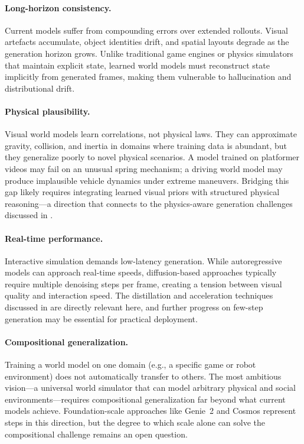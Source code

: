 \documentclass{llmxive}
\begin{document}
\paragraph{Long-horizon consistency.} Current models suffer from compounding errors over extended rollouts. Visual artefacts accumulate, object identities drift, and spatial layouts degrade as the generation horizon grows. Unlike traditional game engines or physics simulators that maintain explicit state, learned world models must reconstruct state implicitly from generated frames, making them vulnerable to hallucination and distributional drift.

\paragraph{Physical plausibility.} Visual world models learn correlations, not physical laws. They can approximate gravity, collision, and inertia in domains where training data is abundant, but they generalize poorly to novel physical scenarios. A model trained on platformer videos may fail on an unusual spring mechanism; a driving world model may produce implausible vehicle dynamics under extreme maneuvers. Bridging this gap likely requires integrating learned visual priors with structured physical reasoning---a direction that connects to the physics-aware generation challenges discussed in .

\paragraph{Real-time performance.} Interactive simulation demands low-latency generation. While autoregressive models can approach real-time speeds, diffusion-based approaches typically require multiple denoising steps per frame, creating a tension between visual quality and interaction speed. The distillation and acceleration techniques discussed in  are directly relevant here, and further progress on few-step generation may be essential for practical deployment.

\paragraph{Compositional generalization.} Training a world model on one domain (e.g., a specific game or robot environment) does not automatically transfer to others. The most ambitious vision---a universal world simulator that can model arbitrary physical and social environments---requires compositional generalization far beyond what current models achieve. Foundation-scale approaches like Genie~2 and Cosmos represent steps in this direction, but the degree to which scale alone can solve the compositional challenge remains an open question.
\end{document}
